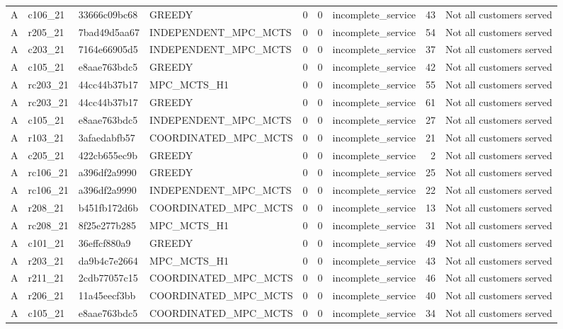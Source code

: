 \begin{table}
{\begin{tabular}{llllrrlrl}
A & c106\_21 & 33666c09bc68 & GREEDY & 0 & 0 & incomplete\_service & 43 & Not all customers served \\
A & r205\_21 & 7bad49d5aa67 & INDEPENDENT\_MPC\_MCTS & 0 & 0 & incomplete\_service & 54 & Not all customers served \\
A & c203\_21 & 7164e66905d5 & INDEPENDENT\_MPC\_MCTS & 0 & 0 & incomplete\_service & 37 & Not all customers served \\
A & c105\_21 & e8aae763bdc5 & GREEDY & 0 & 0 & incomplete\_service & 42 & Not all customers served \\
A & rc203\_21 & 44cc44b37b17 & MPC\_MCTS\_H1 & 0 & 0 & incomplete\_service & 55 & Not all customers served \\
A & rc203\_21 & 44cc44b37b17 & GREEDY & 0 & 0 & incomplete\_service & 61 & Not all customers served \\
A & c105\_21 & e8aae763bdc5 & INDEPENDENT\_MPC\_MCTS & 0 & 0 & incomplete\_service & 27 & Not all customers served \\
A & r103\_21 & 3afaedabfb57 & COORDINATED\_MPC\_MCTS & 0 & 0 & incomplete\_service & 21 & Not all customers served \\
A & c205\_21 & 422cb655ec9b & GREEDY & 0 & 0 & incomplete\_service & 2 & Not all customers served \\
A & rc106\_21 & a396df2a9990 & GREEDY & 0 & 0 & incomplete\_service & 25 & Not all customers served \\
A & rc106\_21 & a396df2a9990 & INDEPENDENT\_MPC\_MCTS & 0 & 0 & incomplete\_service & 22 & Not all customers served \\
A & r208\_21 & b451fb172d6b & COORDINATED\_MPC\_MCTS & 0 & 0 & incomplete\_service & 13 & Not all customers served \\
A & rc208\_21 & 8f25e277b285 & MPC\_MCTS\_H1 & 0 & 0 & incomplete\_service & 31 & Not all customers served \\
A & c101\_21 & 36effcf880a9 & GREEDY & 0 & 0 & incomplete\_service & 49 & Not all customers served \\
A & r203\_21 & da9b4c7e2664 & MPC\_MCTS\_H1 & 0 & 0 & incomplete\_service & 43 & Not all customers served \\
A & r211\_21 & 2cdb77057c15 & COORDINATED\_MPC\_MCTS & 0 & 0 & incomplete\_service & 46 & Not all customers served \\
A & r206\_21 & 11a45eecf3bb & COORDINATED\_MPC\_MCTS & 0 & 0 & incomplete\_service & 40 & Not all customers served \\
A & c105\_21 & e8aae763bdc5 & COORDINATED\_MPC\_MCTS & 0 & 0 & incomplete\_service & 34 & Not all customers served \\

\end{tabular}}
\end{table}
